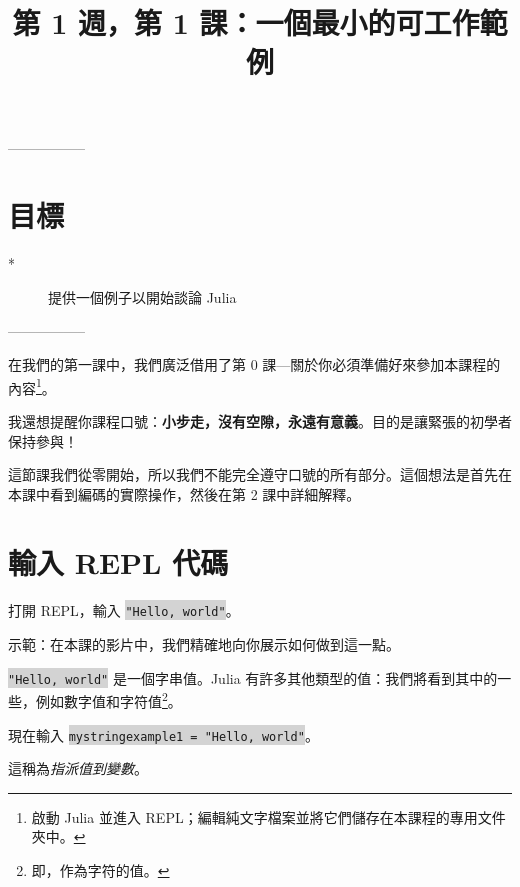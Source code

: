 \documentclass[]{article}
\begin{document}
\author{}  \date{}
\title{第 1 週，第 1 課：一個最小的可工作範例}
\maketitle

\vspace*{-2cm}
-----------------

\section*{目標}
\begin{description}
	\item[*] 提供一個例子以開始談論 Julia
\end{description}

-----------------

在我們的第一課中，我們廣泛借用了第 0 課---關於你必須準備好來參加本課程的內容\footnote{啟動 Julia 並進入 REPL；編輯純文字檔案並將它們儲存在本課程的專用文件夾中。}。

我還想提醒你課程口號：{\bf 小步走，沒有空隙，永遠有意義}。目的是讓緊張的初學者保持參與！

這節課我們從零開始，所以我們不能完全遵守口號的所有部分。這個想法是首先在本課中看到編碼的實際操作，然後在第 2 課中詳細解釋。

\section*{輸入 REPL 代碼}

\begin{minipage}{7cm}
打開 REPL，輸入 \colorbox{lightgray}{\tt "Hello, world"}。
\end{minipage}
\hspace{4em}\begin{minipage}{7cm}
	 示範：在本課的影片中，我們精確地向你展示如何做到這一點。
 \end{minipage}

\colorbox{lightgray}{\tt "Hello, world"} 是一個字串值。Julia 有許多其他類型的值：我們將看到其中的一些，例如數字值和字符值\footnote{即，作為字符的值。}。

\begin{minipage}{7cm}
現在輸入 \colorbox{lightgray}{\tt mystringexample1 = "Hello, world"}。
\end{minipage}
\hspace{4em} \begin{minipage}{7cm}
這稱為\emph{指派值到變數}。
\end{minipage}
\end{document}

